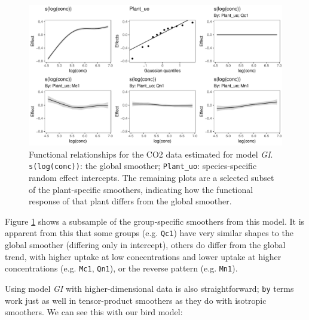 \documentclass[12pt]{article}
\begin{document}
\begin{figure}
\centering
\includegraphics{../figures/Fig13.pdf}
\caption{\label{fig:Fig13}Functional relationships for the CO2 data
estimated for model \emph{GI}. \texttt{s(log(conc))}: the global
smoother; \texttt{Plant\_uo}: species-specific random effect intercepts.
The remaining plots are a selected subset of the plant-specific
smoothers, indicating how the functional response of that plant differs
from the global smoother.}
\end{figure}

Figure \ref{fig:Fig13} shows a subsample of the group-specific smoothers
from this model. It is apparent from this that some groups (e.g.
\texttt{Qc1}) have very similar shapes to the global smoother (differing
only in intercept), others do differ from the global trend, with higher
uptake at low concentrations and lower uptake at higher concentrations
(e.g. \texttt{Mc1}, \texttt{Qn1}), or the reverse pattern (e.g.
\texttt{Mn1}).

Using model \emph{GI} with higher-dimensional data is also
straightforward; \texttt{by} terms work just as well in tensor-product
smoothers as they do with isotropic smoothers. We can see this with our
bird model:
\end{document}
